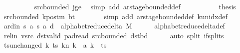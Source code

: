\begin{isabellebody}
\ \ \ \ \ \ \ \ \isamarkupfalse%
\ src{\isacharunderscore}{\kern0pt}bounded\ jge\ \isamarkupfalse%
\ {\isacharparenleft}{\kern0pt}simp\ add{\isacharcolon}{\kern0pt}\ ar{\isacharunderscore}{\kern0pt}stage{\isacharunderscore}{\kern0pt}bounded{\isacharunderscore}{\kern0pt}def{\isacharparenright}{\kern0pt}\isanewline
\ \ \ \ \isamarkupfalse%
\isanewline
\ \ \ \ \isamarkupfalse%
\ {\isacharquery}{\kern0pt}thesis\ \isamarkupfalse%
\ src{\isacharunderscore}{\kern0pt}bounded\ kpos{\isacharunderscore}{\kern0pt}tm\ bt\isanewline
\ \ \ \ \ \ \isamarkupfalse%
\ {\isacharparenleft}{\kern0pt}simp\ add{\isacharcolon}{\kern0pt}\ ar{\isacharunderscore}{\kern0pt}stage{\isacharunderscore}{\kern0pt}bounded{\isacharunderscore}{\kern0pt}def\ k{\isacharunderscore}{\kern0pt}unidx{\isacharunderscore}{\kern0pt}def{\isacharparenright}{\kern0pt}\isanewline
\ \ \isamarkupfalse%
\isanewline
\ \ \isamarkupfalse%
\ ard{\isacharunderscore}{\kern0pt}in{\isacharcolon}{\kern0pt}\ {\isachardoublequoteopen}{\isacharparenleft}{\kern0pt}{\isacharquery}{\kern0pt}s{\isacharcomma}{\kern0pt}\ {\isacharquery}{\kern0pt}a{\isacharcomma}{\kern0pt}\ {\isacharquery}{\kern0pt}s{\isacharprime}{\kern0pt}{\isacharcomma}{\kern0pt}\ {\isacharquery}{\kern0pt}a{\isacharcomma}{\kern0pt}\ {\isacharquery}{\kern0pt}d{\isacharparenright}{\kern0pt}\ {\isasymin}\ alphabet{\isacharunderscore}{\kern0pt}reduce{\isacharunderscore}{\kern0pt}delta\ M{\isachardoublequoteclose}\isanewline
\ \ \ \ \isamarkupfalse%
\ alphabet{\isacharunderscore}{\kern0pt}reduce{\isacharunderscore}{\kern0pt}delta{\isacharunderscore}{\kern0pt}def\isanewline
\ \ \ \ \isamarkupfalse%
\ rel{\isacharunderscore}{\kern0pt}in\ vsrc\ dst{\isacharunderscore}{\kern0pt}valid\ pad{\isacharunderscore}{\kern0pt}read\ src{\isacharunderscore}{\kern0pt}bounded\ dst{\isacharunderscore}{\kern0pt}bd\isanewline
\ \ \ \ \isamarkupfalse%
\ {\isacharparenleft}{\kern0pt}auto\ split{\isacharcolon}{\kern0pt}\ if{\isacharunderscore}{\kern0pt}splits{\isacharparenright}{\kern0pt}\isanewline
\ \ \isamarkupfalse%
\ ts{\isacharunderscore}{\kern0pt}unchanged{\isacharcolon}{\kern0pt}\ {\isachardoublequoteopen}{\isacharparenleft}{\kern0pt}{\isasymlambda}k{\isachardot}{\kern0pt}\ {\isacharparenleft}{\kern0pt}ts\ k{\isacharparenright}{\kern0pt}{\isacharparenleft}{\kern0pt}n\ k\ {\isacharcolon}{\kern0pt}{\isacharequal}{\kern0pt}\ {\isacharquery}{\kern0pt}a\ k{\isacharparenright}{\kern0pt}{\isacharparenright}{\kern0pt}\ {\isacharequal}{\kern0pt}\ ts{\isachardoublequoteclose}\ \isamarkupfalse%

\end{isabellebody}
